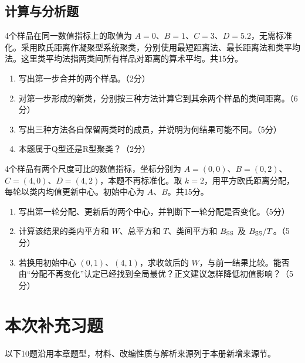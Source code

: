 \par\addvspace{6pt}\noindent\begin{minipage}{\linewidth}

\subsection{计算与分析题}


4个样品在同一数值指标上的取值为 \(A=0\)、\(B=1\)、\(C=3\)、\(D=5.2\)，无需标准化。采用欧氏距离作凝聚型系统聚类，分别使用最短距离法、最长距离法和类平均法。这里类平均法指两类间所有样品对距离的算术平均。共15分。

\begin{enumerate}
\def\labelenumi{\arabic{enumi}.}
\tightlist
\item
  写出第一步合并的两个样品。（2分）
\item
  对第一步形成的新类，分别按三种方法计算它到其余两个样品的类间距离。（6分）
\item
  写出三种方法各自保留两类时的成员，并说明为何结果可能不同。（5分）
\item
  本题属于Q型还是R型聚类？（2分）
\end{enumerate}



\end{minipage}\par\vspace{4pt}

\par\addvspace{6pt}\noindent\begin{minipage}{\linewidth}


4个样品有两个尺度可比的数值指标，坐标分别为 \(A=(0,0)\)、\(B=(0,2)\)、\(C=(4,0)\)、\(D=(4,2)\)，本题不再标准化。取 \(k=2\)，用平方欧氏距离分配，每轮以类内均值更新中心。初始中心为 \(A\)、\(B\)。共15分。

\begin{enumerate}
\def\labelenumi{\arabic{enumi}.}
\tightlist
\item
  写出第一轮分配、更新后的两个中心，并判断下一轮分配是否变化。（5分）
\item
  计算该结果的类内平方和 \(W\)、总平方和 \(T\)、类间平方和 \(B_{\rm SS}\) 及 \(B_{\rm SS}/T\)。（5分）
\item
  若换用初始中心 \((0,1)\)、\((4,1)\)，求收敛后的 \(W\)，与前一结果比较。能否由``分配不再变化''认定已经找到全局最优？正文建议怎样降低初值影响？（5分）
\end{enumerate}



\end{minipage}\par\vspace{4pt}
\clearpage\section{本次补充习题}
以下10题沿用本章题型，材料、改编性质与解析来源列于本册新增来源节。


